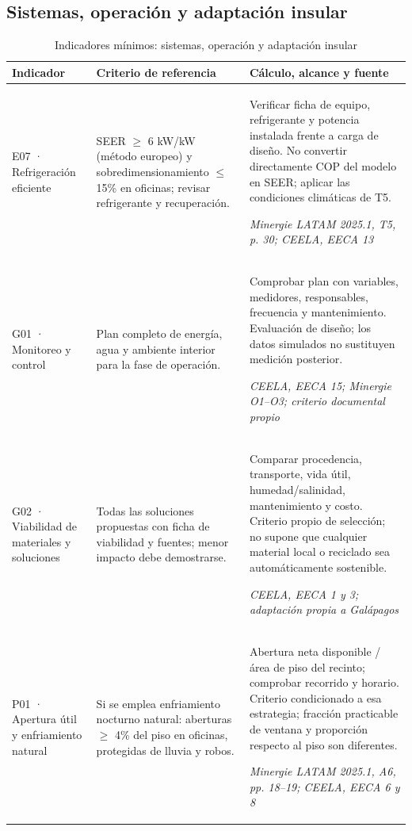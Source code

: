 \subsection{Sistemas, operación y adaptación insular}
\begin{table}[H]\centering\caption{Indicadores mínimos: sistemas, operación y adaptación insular}
{\fontsize{9.5}{12}\selectfont\singlespacing\renewcommand{\arraystretch}{1.25}\setlength{\tabcolsep}{4pt}\begin{tabular}{>{\raggedright\arraybackslash}p{2.9cm}>{\raggedright\arraybackslash}p{5.2cm}>{\raggedright\arraybackslash}p{5.9cm}}\toprule Indicador & Criterio de referencia & Cálculo, alcance y fuente \\ \midrule
E07 · Refrigeración eficiente & SEER $\geq$ 6 kW/kW (método europeo) y sobredimensionamiento $\leq$ 15\% en oficinas; revisar refrigerante y recuperación. & Verificar ficha de equipo, refrigerante y potencia instalada frente a carga de diseño. No convertir directamente COP del modelo en SEER; aplicar las condiciones climáticas de T5.\par\textit{Minergie LATAM 2025.1, T5, p. 30; CEELA, EECA 13} \\[4pt]
G01 · Monitoreo y control & Plan completo de energía, agua y ambiente interior para la fase de operación. & Comprobar plan con variables, medidores, responsables, frecuencia y mantenimiento. Evaluación de diseño; los datos simulados no sustituyen medición posterior.\par\textit{CEELA, EECA 15; Minergie O1–O3; criterio documental propio} \\[4pt]
G02 · Viabilidad de materiales y soluciones & Todas las soluciones propuestas con ficha de viabilidad y fuentes; menor impacto debe demostrarse. & Comparar procedencia, transporte, vida útil, humedad/salinidad, mantenimiento y costo. Criterio propio de selección; no supone que cualquier material local o reciclado sea automáticamente sostenible.\par\textit{CEELA, EECA 1 y 3; adaptación propia a Galápagos} \\[4pt]
P01 · Apertura útil y enfriamiento natural & Si se emplea enfriamiento nocturno natural: aberturas $\geq$ 4\% del piso en oficinas, protegidas de lluvia y robos. & Abertura neta disponible / área de piso del recinto; comprobar recorrido y horario. Criterio condicionado a esa estrategia; fracción practicable de ventana y proporción respecto al piso son diferentes.\par\textit{Minergie LATAM 2025.1, A6, pp. 18–19; CEELA, EECA 6 y 8} \\[4pt]
\bottomrule\end{tabular}}\end{table}\par\medskip
